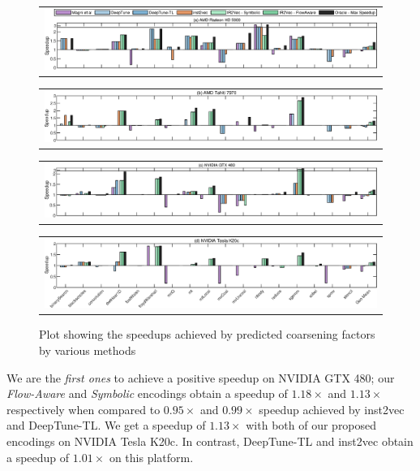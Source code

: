 \begin{figure}
    \centering
    \begin{tabular}{@{}c@{}}
        \includegraphics[scale=0.8, width=\textwidth]{figures/TC/radeon1-crop.eps}
    \end{tabular}
    \begin{tabular}{@{}c@{}}
        \includegraphics[scale=0.8, width=\textwidth]{figures/TC/tahiti2-crop.eps}
    \end{tabular}
    \begin{tabular}{@{}c@{}}
        \includegraphics[scale=0.8, width=\textwidth]{figures/TC/gtx-crop.eps}
    \end{tabular}
    \begin{tabular}{@{}c@{}}
        \includegraphics[scale=0.8, width=\textwidth]{figures/TC/tesla2-crop.eps}
    \end{tabular}
    \caption{Plot showing the speedups achieved by predicted coarsening factors by various methods}
    \label{fig:tcSpeedup}
     \vspace*{-0.4cm}
\end{figure}


We are the \textit{first ones} to achieve a positive speedup on NVIDIA GTX 480; our \textit{Flow-Aware} and \textit{Symbolic} encodings obtain a speedup of $ 1.18\times$ and $ 1.13\times$ respectively when compared to $ 0.95\times$ and $ 0.99\times$ speedup achieved by inst2vec and DeepTune-TL. 
We get a speedup of $ 1.13\times$ with both of our proposed encodings on NVIDIA Tesla K20c. In contrast, DeepTune-TL and inst2vec obtain a speedup of $ 1.01\times$ on this platform.

